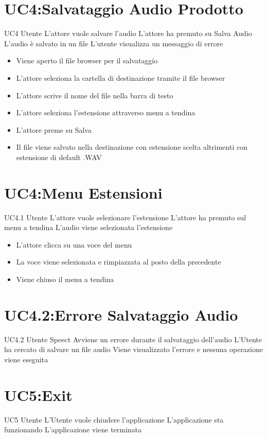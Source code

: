 \documentclass[../AnalisideiRequisiti.tex]{subfiles}
\begin{document}
\section{UC4:Salvataggio Audio Prodotto}
\UserCase
{UC4}
{Utente}
{}
{L'attore vuole salvare l'audio}
{L'attore ha premuto su Salva Audio}
{L'audio è salvato in un file}
{L'utente visualizza un messaggio di errore }
{
		\begin{itemize}
		\item{} Viene aperto il file browser per il salvataggio
		\item{} L'attore seleziona la cartella di destinazione tramite il file browser 
		\item{} L'attore scrive il nome del file nella barra di testo
		\item{} L'attore seleziona l'estensione attraverso menu a tendina
		\item{} L'attore preme su Salva 
		\item{} Il file viene salvato nella destinazione con estensione scelta altrimenti con estensione di default .WAV
\end{itemize}
}
\section{UC4:Menu Estensioni}
\UserCase
{UC4.1}
{Utente}
{}
{L'attore vuole selezionare l'estensione}
{L'attore ha premuto sul menu a tendina}
{L'audio viene selezionata l'estensione}
{}
{
\begin{itemize}
	\item{} L'attore clicca su una voce del menu
	\item{} La voce viene selezionata e rimpiazzata al posto della precedente
	\item{} Viene chiuso il menu a tendina

\end{itemize}
}		
\section{UC4.2:Errore Salvataggio Audio}
\UserCase
{UC4.2}
{Utente}
{Speect}
{Avviene un errore durante il salvataggio dell'audio}
{L'Utente ha cercato di salvare un file audio}
{Viene visualizzato l'errore e nessuna operazione viene eseguita}
{}
{}

\section{UC5:Exit}
\UserCase
{UC5}
{Utente}
{}
{L'Utente vuole chiudere l'applicazione }
{L'applicazione sta funzionando}
{L'applicazione viene terminata}
{}
{
}
\end{document}
